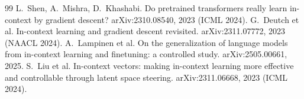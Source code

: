 \documentclass[11pt]{article}
\begin{document}
\begin{thebibliography}{99}
 L.~Shen, A.~Mishra, D.~Khashabi. Do pretrained transformers really learn in-context by gradient descent? arXiv:2310.08540, 2023 (ICML 2024).
 G.~Deutch et al. In-context learning and gradient descent revisited. arXiv:2311.07772, 2023 (NAACL 2024).
 A.~Lampinen et al. On the generalization of language models from in-context learning and finetuning: a controlled study. arXiv:2505.00661, 2025.
 S.~Liu et al. In-context vectors: making in-context learning more effective and controllable through latent space steering. arXiv:2311.06668, 2023 (ICML 2024).
\end{thebibliography}
\end{document}
